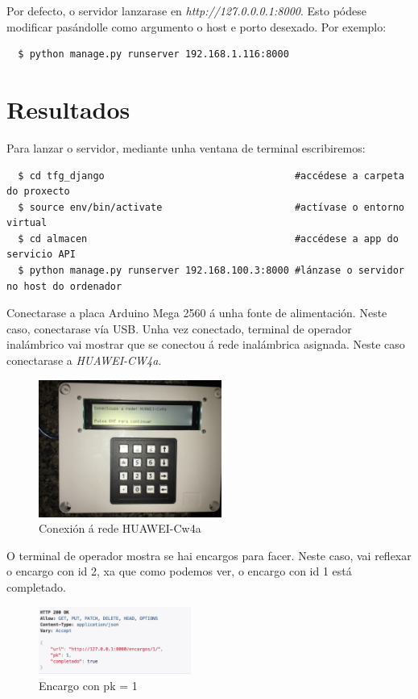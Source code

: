 \documentclass[11pt,twoside]{book}
\begin{document}
Por defecto, o servidor lanzarase en \textit{http://127.0.0.0.1:8000}. Esto pódese modificar pasándolle como argumento o host e porto desexado. Por exemplo:

\begin{verbatim}
  $ python manage.py runserver 192.168.1.116:8000
\end{verbatim}

\chapter{Resultados}

Para lanzar o servidor, mediante unha ventana de terminal escribiremos:

\begin{verbatim}
  $ cd tfg_django                                 #accédese a carpeta do proxecto
  $ source env/bin/activate                       #actívase o entorno virtual
  $ cd almacen                                    #accédese a app do servicio API
  $ python manage.py runserver 192.168.100.3:8000 #lánzase o servidor no host do ordenador
\end{verbatim}

Conectarase a placa Arduino Mega 2560 á unha fonte de alimentación. Neste caso, conectarase vía USB. Unha vez conectado, terminal de operador inalámbrico vai mostrar que se conectou á rede inalámbrica asignada. Neste caso conectarase a \textit{HUAWEI-CW4a}.

\begin{figure}[H]
	\begin{center}
		\includegraphics[width=6cm]{images/conectar_rede.JPG}
	\end{center}
	\caption{Conexión á rede HUAWEI-Cw4a}
	\label{fig:Encargo1}
\end{figure}

O terminal de operador mostra se hai encargos para facer. Neste caso, vai reflexar o encargo con id 2, xa que como podemos ver, o encargo con id 1 está completado.

\begin{figure}[H]
	\begin{center}
		\includegraphics[width=5cm]{images/encargo_1.png}
	\end{center}
	\caption{Encargo con pk = 1}
	\label{fig:Encargo1}
\end{figure}
\end{document}
